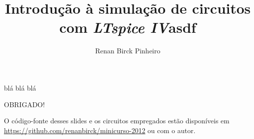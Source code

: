 \documentclass{beamer}
\title{Introdução à simulação de circuitos com \textit{LTspice IV}}
\author{Renan Birck Pinheiro}
\institute{Universidade Federal de Santa Maria}
\begin{document}
\begin{frame}
\titlepage
\end{frame}

\begin{frame}
\title{asdf}
blá blá blá
\end{frame}
\begin{frame}
{\LARGE OBRIGADO!}
\end{frame}

\begin{frame}
O código-fonte desses slides e os circuitos empregados estão disponíveis em \url{https://github.com/renanbirck/minicurso-2012} ou com o autor.
\end{frame}
\end{document}
